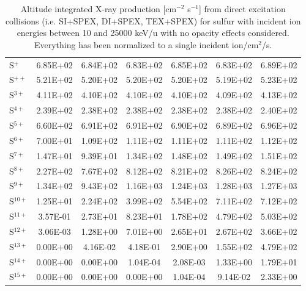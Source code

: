 \begin{table}
\begin{tabular}{l|c|c|c|c|c|c}
    S$^+$ & 6.85E+02 & 6.84E+02 & 6.83E+02 & 6.85E+02 & 6.83E+02 & 6.89E+02 \\
    S$^{++}$ & 5.21E+02 & 5.20E+02 & 5.20E+02 & 5.20E+02 & 5.19E+02 & 5.23E+02 \\
    S$^{3+}$ & 4.11E+02 & 4.10E+02 & 4.10E+02 & 4.10E+02 & 4.09E+02 & 4.13E+02 \\
    S$^{4+}$ & 2.39E+02 & 2.38E+02 & 2.38E+02 & 2.38E+02 & 2.38E+02 & 2.40E+02 \\
    S$^{5+}$ & 6.60E+02 & 6.91E+02 & 6.91E+02 & 6.90E+02 & 6.89E+02 & 6.96E+02 \\
    S$^{6+}$ & 7.00E+01 & 1.09E+02 & 1.11E+02 & 1.11E+02 & 1.11E+02 & 1.12E+02 \\
    S$^{7+}$ & 1.47E+01 & 9.39E+01 & 1.34E+02 & 1.48E+02 & 1.49E+02 & 1.51E+02 \\
    S$^{8+}$ & 2.27E+02 & 7.67E+02 & 8.12E+02 & 8.21E+02 & 8.26E+02 & 8.24E+02 \\
    S$^{9+}$ & 1.34E+02 & 9.43E+02 & 1.16E+03 & 1.24E+03 & 1.28E+03 & 1.27E+03 \\
    S$^{10+}$ & 1.25E+01 & 2.24E+02 & 3.99E+02 & 5.54E+02 & 7.11E+02 & 7.12E+02 \\
    S$^{11+}$ & 3.57E-01 & 2.73E+01 & 8.23E+01 & 1.78E+02 & 4.79E+02 & 5.03E+02 \\
    S$^{12+}$ & 3.06E-03 & 1.28E+00 & 7.01E+00 & 2.65E+01 & 2.67E+02 & 3.66E+02 \\
    S$^{13+}$ & 0.00E+00 & 4.16E-02 & 4.18E-01 & 2.90E+00 & 1.55E+02 & 4.79E+02 \\
    S$^{14+}$ & 0.00E+00 & 0.00E+00 & 1.04E-04 & 2.08E-03 & 1.33E+00 & 1.79E+01 \\
    S$^{15+}$ & 0.00E+00 & 0.00E+00 & 0.00E+00 & 1.04E-04 & 9.14E-02 & 2.33E+00 \\
    \hline
    \end{tabular}
    \caption{Altitude integrated X-ray production [cm$^{-2}$ s$^{-1}$] from direct excitation collisions (i.e. SI+SPEX, DI+SPEX, TEX+SPEX) for sulfur with incident ion energies between 10 and 25000 keV/u with no opacity effects considered. Everything has been normalized to a single incident ion/cm$^2$/s.}
    \label{tab:SulDEProd}
\end{table}